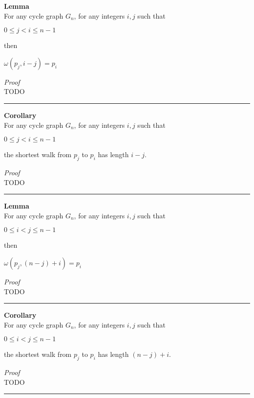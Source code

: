 \documentclass[a4paper,12pt]{article}
\begin{document}
\begin{tcolorbox}
\textbf{Lemma}\\
For any cycle graph $G_n$, for any integers $i, j$ such that
\begin{center}
$0 \leq j < i \leq n - 1$
\end{center}
then
\begin{center}
$\omega(p_j, i - j) = p_i$
\end{center}
\end{tcolorbox}
\noindent
\textit{Proof}\\
TODO
\begin{center}
\noindent\rule{8cm}{0.4pt}
\end{center}

\begin{tcolorbox}
\textbf{Corollary}\\
For any cycle graph $G_n$, for any integers $i, j$ such that
\begin{center}
$0 \leq j < i \leq n - 1$
\end{center}
the shortest walk from $p_j$ to $p_i$ has length $i - j$.
\end{tcolorbox}
\noindent
\textit{Proof}\\
TODO
\begin{center}
\noindent\rule{8cm}{0.4pt}
\end{center}

\begin{tcolorbox}
\textbf{Lemma}\\
For any cycle graph $G_n$, for any integers $i, j$ such that
\begin{center}
$0 \leq i < j \leq n - 1$
\end{center}
then
\begin{center}
$\omega(p_j, (n - j) + i) = p_i$
\end{center}
\end{tcolorbox}
\noindent
\textit{Proof}\\
TODO
\begin{center}
\noindent\rule{8cm}{0.4pt}
\end{center}

\begin{tcolorbox}
\textbf{Corollary}\\
For any cycle graph $G_n$, for any integers $i, j$ such that
\begin{center}
$0 \leq i < j \leq n - 1$
\end{center}
the shortest walk from $p_j$ to $p_i$ has length $(n - j) + i$.
\end{tcolorbox}
\noindent
\textit{Proof}\\
TODO
\begin{center}
\noindent\rule{8cm}{0.4pt}
\end{center}
\end{document}
